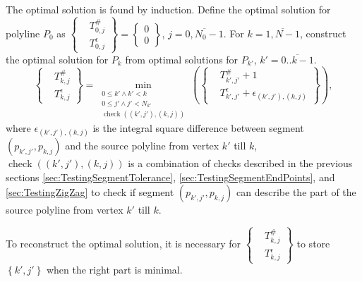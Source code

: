 \documentclass[conference]{IEEEtran}
\DeclareMathOperator{\functioncheck}{check}
\begin{document}
The optimal solution is found by induction.
Define the optimal solution for polyline $P_0$ as
$
  \left\{
    \begin{aligned}
      & T_{0, j}^{\#}\\
      & T_{0, j}^{\epsilon}
    \end{aligned}
  \right\}
  =
  \left\{
    \begin{aligned}
      0\\
      0
    \end{aligned}
  \right\}
$,
$
  {
    j = \overline{0, N_0 - 1}
  }
$.
For $k = \overline{1, N - 1}$, construct the optimal solution for $P_k$ from optimal solutions for $P_{k'}$, $k' = \overline{0..k-1}$.
\begin{equation*}
  \left\{
    \begin{aligned}
      & T_{k, j}^{\#}\\
      & T_{k, j}^{\epsilon}
    \end{aligned}
  \right\}
  =
  \min
  _
  {
    \begin{aligned}
      0 \leq k' \wedge k' < k\\
      0 \leq j' \wedge j' < N_{k'}\\
      \functioncheck
      {
        \left(
          \left( k', j' \right),
          \left( k, j \right)
        \right)
      }
    \end{aligned}
  }
  {
    \left(
      \left\{
        \begin{aligned}
          & T_{k', j'}^{\#} + 1\\
          & T_{k', j'}^{\epsilon}
          +
          \epsilon
          _
          {
            \left( k', j' \right),
            \left( k, j \right)
          }
        \end{aligned}
      \right\}
    \right)
  }
  ,
\end{equation*}
where
$
  \epsilon
  _
  {
    \left( k', j' \right),
    \left( k, j \right)
  }
$
is the integral square difference between segment
$
  \left( p_{k', j'}, p_{k, j} \right)
$
and the source polyline from vertex $k'$ till $k$,
$
  \functioncheck
  {
    \left(
      \left( k', j' \right),
      \left( k, j \right)
    \right)
  }
$
is a combination of checks described in the previous sections \ref{sec:TestingSegmentTolerance}, \ref{sec:TestingSegmentEndPoints}, and \ref{sec:TestingZigZag} to check if segment
$
  \left( p_{k', j'}, p_{k, j} \right)
$
can describe the part of the source polyline from vertex $k'$ till $k$.

To reconstruct the optimal solution, it is necessary for
$
  \left\{
    \begin{aligned}
      & T_{k, j}^{\#}\\
      & T_{k, j}^{\epsilon}
    \end{aligned}
  \right\}
$
to store $\left\{ k', j' \right\}$ when the right part is minimal.
\end{document}
